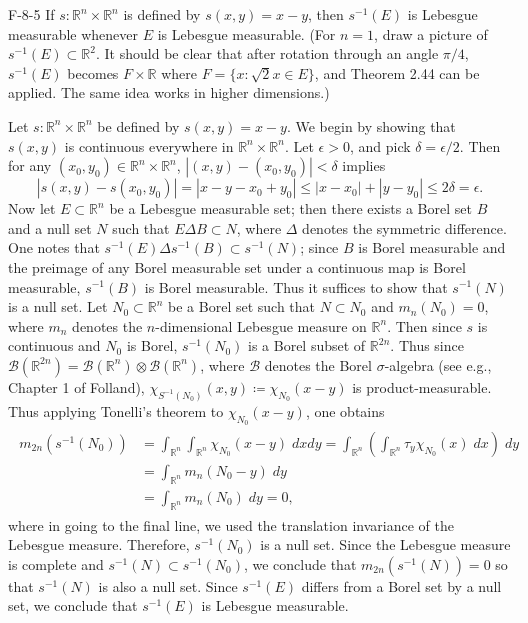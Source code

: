 \documentclass{article}
\begin{document}
	
	\begin{prb}{F-8-5}
		If $s: \mathbb{R}^{n} \times \mathbb{R}^{n}$ is defined by $s(x, y) = x - y$, then $s^{-1}(E)$ is Lebesgue measurable whenever $E$ is Lebesgue measurable. (For $n = 1$, draw a picture of $s^{-1}(E) \subset \mathbb{R}^{2}$. It should be clear that after rotation through an angle $\pi/4$, $s^{-1}(E)$ becomes $F \times \mathbb{R}$ where $F = \{x: \sqrt{2}x \in E\}$, and Theorem 2.44 can be applied. The same idea works in higher dimensions.)
	\end{prb}
	Let $s: \mathbb{R}^{n}\times \mathbb{R}^{n}$ be defined by $s(x, y) = x - y$. We begin by showing that $s(x,y)$ is continuous everywhere in $\mathbb{R}^{n} \times \mathbb{R}^{n}$. Let $\epsilon > 0$, and pick $\delta = \epsilon/2$. Then for any $(x_{0}, y_{0}) \in \mathbb{R}^{n} \times \mathbb{R}^{n}$, $|(x,y) - (x_{0}, y_{0})| < \delta$ implies 
	\begin{equation*}
		|s(x,y) - s(x_{0},y_{0})| = |x - y - x_{0} + y_{0}| \leq |x - x_{0}| + |y - y_{0}| \leq 2\delta = \epsilon. 
	\end{equation*}
	Now let $E \subset \mathbb{R}^{n}$ be a Lebesgue measurable set; then there exists a Borel set $B$ and a null set $N$ such that $E \Delta B \subset N$, where $\Delta$ denotes the symmetric difference. One notes that $s^{-1}(E) \Delta s^{-1}(B) \subset s^{-1}(N)$; since $B$ is Borel measurable and the preimage of any Borel measurable set under a continuous map is Borel measurable, $s^{-1}(B)$ is Borel measurable. Thus it suffices to show that $s^{-1}(N)$ is a null set. Let $N_{0} \subset \mathbb{R}^{n}$ be a Borel set such that $N \subset N_{0}$ and $m_{n}(N_{0}) = 0$, where $m_{n}$ denotes the $n$-dimensional Lebesgue measure on $\mathbb{R}^{n}$. Then since $s$ is continuous and $N_{0}$ is Borel, $s^{-1}(N_{0})$ is a Borel subset of $\mathbb{R}^{2n}$. Thus since $\mathscr{B}(\mathbb{R}^{2n}) = \mathscr{B}(\mathbb{R}^{n})\otimes \mathscr{B}(\mathbb{R}^{n})$, where $\mathscr{B}$ denotes the Borel $\sigma$-algebra (see e.g., Chapter 1 of Folland), $\chi_{S^{-1}(N_{0})}(x,y) \coloneqq \chi_{N_{0}}(x - y)$ is product-measurable. Thus applying Tonelli's theorem to $\chi_{N_{0}}(x - y)$, one obtains 
	\begin{align*}
		\begin{split} 
		m_{2n}(s^{-1}(N_{0})) &= \int_{\mathbb{R}^{n}}\int_{\mathbb{R}^{n}}\chi_{N_{0}}(x - y)\;dxdy = \int_{\mathbb{R}^{n}}\left(\int_{\mathbb{R}^{n}}\tau_{y}\chi_{N_{0}}(x)\;dx\right)\;dy \\
		&= \int_{\mathbb{R}^{n}}m_{n}(N_{0} - y)\;dy \\
		&= \int_{\mathbb{R}^{n}}m_{n}(N_{0})\;dy = 0, 
		\end{split} 
	\end{align*}
	where in going to the final line, we used the translation invariance of the Lebesgue measure. Therefore, $s^{-1}(N_{0})$ is a null set. Since the Lebesgue measure is complete and $s^{-1}(N) \subset s^{-1}(N_{0})$, we conclude that $m_{2n}(s^{-1}(N)) = 0$ so that $s^{-1}(N)$ is also a null set. Since $s^{-1}(E)$ differs from a Borel set by a null set, we conclude that $s^{-1}(E)$ is Lebesgue measurable. 
	
\end{document}
